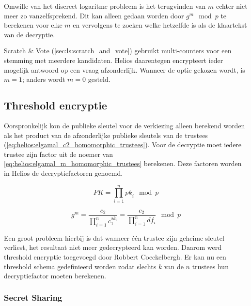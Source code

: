 \npar Omwille van het discreet logaritme probleem is het terugvinden van $m$ echter niet meer zo vanzelfsprekend.\cite{menezes_vanstone_oorschot_handbook_of_applied_cryptography} Dit kan alleen gedaan worden door $g^m \mod{p}$ te berekenen voor elke $m$ en vervolgens te zoeken welke hetzelfde is als de klaartekst van de decryptie.

\npar Scratch \& Vote (\ref{sec:ls:scratch_and_vote}) gebruikt multi-counters voor een stemming met meerdere kandidaten. Helios daarentegen encrypteert ieder mogelijk antwoord op een vraag afzonderlijk. Wanneer de optie gekozen wordt, is $m = 1$; anders wordt $m = 0$ gesteld.

\subsection{Threshold encryptie}
\label{sec:helios:threshold_encryptie}


Oorspronkelijk kon de publieke sleutel voor de verkiezing alleen berekend worden als het product van de afzonderlijke publieke sleutels van de trustees (\ref{eq:helios:elgamal_c2_homomorphic_trustees}). Voor de decryptie moet iedere trustee zijn factor uit de noemer van \ref{eq:helios:elgamal_m_homomorphic_trustees} berekenen. Deze factoren worden in Helios de decryptiefactoren genoemd.

\begin{equation}
  \label{eq:helios:elgamal_c2_homomorphic_trustees}
  PK = \prod_{i=1}^n{{pk}_i} \mod{p}
\end{equation}

\begin{equation}
  \label{eq:helios:elgamal_m_homomorphic_trustees}
  g^m = \frac{c_2}{\prod_{i=1}^n{c_1^{{sk}_i}}} = \frac{c_2}{\prod_{i=1}^n{{df}_i}} \mod{p}
\end{equation}

\npar Een groot probleem hierbij is dat wanneer \'e\'en trustee zijn geheime sleutel verliest, het resultaat niet meer gedecrypteerd kan worden. Daarom werd threshold encryptie toegevoegd door Robbert Coeckelbergh.\cite{coeckelbergh_toepassing_en_uitbreiding_van_het_helios_online_verkiezingssysteem} Er kan nu een threshold schema gedefinieerd worden zodat slechts $k$ van de $n$ trustees hun decryptiefactor moeten berekenen.

\subsubsection{Secret Sharing}

